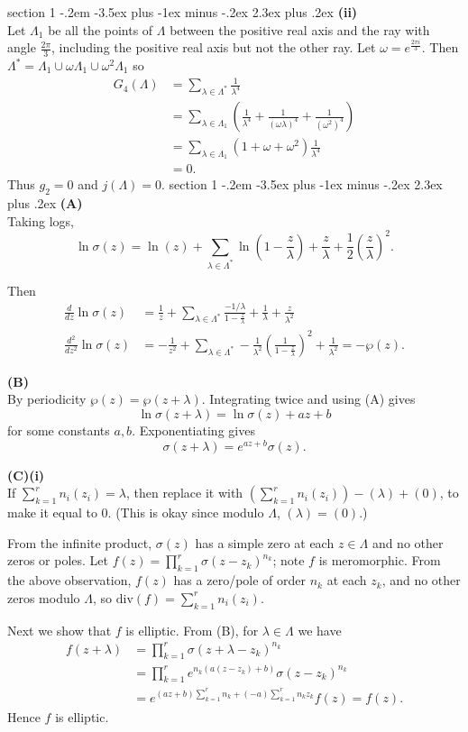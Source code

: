 \documentclass[12pt]{article}
\makeatletter
\theoremstyle{norm}
\newcommand{\rc}[1]{\frac{1}{#1}}
\newcommand{\la}[0]{\lambda}
\newcommand{\La}[0]{\Lambda}
\newcommand{\pa}[1]{\left( {#1} \right)}
\newcommand{\subprob}[1]{\noindent\textbf{#1}\\}
\newcommand{\pf}[2]{\pa{\frac{#1}{#2}}}
\newenvironment{problem}{\@startsection
       {section}
       {1}
       {-.2em}
       {-3.5ex plus -1ex minus -.2ex}
       {2.3ex plus .2ex}
       {\pagebreak[3]%
       \large\bf\noindent{Problem }
       }
       }
       {%
       }
\makeatother
\begin{document}
\begin{problem} {\it }
\subprob{(ii)}
Let $\La_1$ be all the points of $\La$ between the positive real axis and the ray with angle $\frac{2\pi}{3}$, including the positive real axis but not the other ray. Let $\omega=e^{\frac{2\pi i}{3}}$. Then $\La^*=\La_1\cup \omega\La_1\cup \omega^2\La_1$ so
\begin{align*}
G_4(\La)&=\sum_{\la\in \La^*}\rc{\la^4}\\
&=\sum_{\la\in \La_1}\pa{\rc{\la^4}+\rc{(\omega \la)^4}+\rc{(\omega^2)^4}}\\
&=\sum_{\la\in \La_1}(1+\omega+\omega^2)\rc{\la^4}\\
&=0.
\end{align*}
Thus $g_2=0$ and $j(\La)=0$.
\end{problem}
\begin{problem} {\it }
\subprob{(A)}
Taking logs,
\[
\ln \sigma(z)=\ln(z)+\sum_{\la\in \La^*} \ln\pa{1-\frac{z}{\la}}+\frac{z}{\la} +\rc{2} \pf{z}{\la}^2.
\]

Then
\begin{align*}
\frac{d}{dz}\ln \sigma(z)&=\rc z+\sum_{\la\in \La^*} \frac{-1/\la}{1-\frac z{\la}}+\rc{\la}+\frac{z}{\la^2}\\
\frac{d^2}{dz^2}\ln \sigma(z)&=-\rc{z^2}+\sum_{\la\in \La^*} -\rc{\la^2}\pf{1}{1-\frac{z}{\la}}^2+\frac{1}{\la^2}=-\wp(z).
\end{align*}

\subprob{(B)}
By periodicity $\wp(z)=\wp(z+\la)$. Integrating twice and using (A) gives
\[
\ln\sigma(z+\la)=\ln\sigma(z)+az+b
\]
for some constants $a,b$. 
Exponentiating gives
\[
\sigma(z+\la)=e^{az+b}\sigma(z).
\]

\subprob{(C)(i)}
If $\sum_{k=1}^r n_i(z_i)=\la$, then replace it with $\pa{\sum_{k=1}^r n_i(z_i)} - (\la)+(0)$, to make it equal to 0. (This is okay since modulo $\La$, $(\la)=(0)$.)

From the infinite product, $\sigma(z)$ has a simple zero at each $z\in \La$ and no other zeros or poles. 
Let $f(z)=\prod_{k=1}^r \sigma(z-z_k)^{n_k}$; note $f$ is meromorphic. From the above observation, $f(z)$ has a zero/pole of  order $n_k$ at each $z_k$,  %
and no other zeros modulo $\La$, so $\text{div}(f)=\sum_{k=1}^r n_i(z_i)$.

Next we show that $f$ is elliptic. From (B), for $\la\in \La$ we have
\begin{align*}
f(z+\la)&=\prod_{k=1}^r \sigma(z+\la-z_k)^{n_k}\\
&=\prod_{k=1}^r e^{n_k(a(z-z_k)+b)}\sigma(z-z_k)^{n_k}\\
&=e^{(az+b)\sum_{k=1}^r n_k+(-a)\sum_{k=1}^rn_kz_k} f(z)=f(z).
\end{align*}
Hence $f$ is elliptic.\\


\end{problem}
\end{document}
